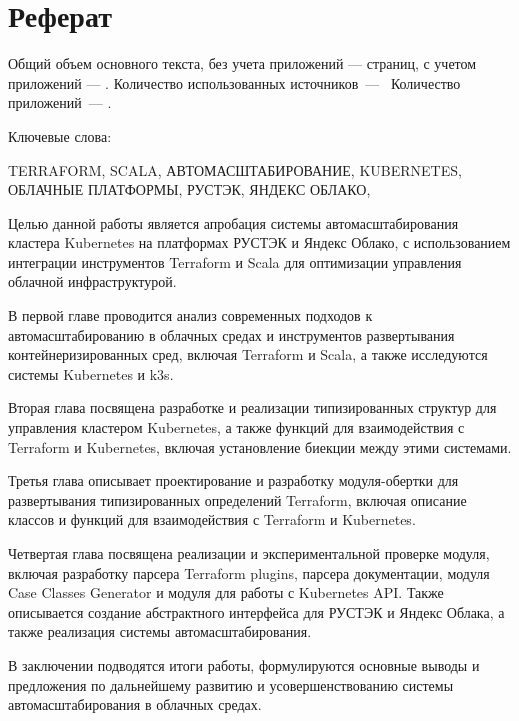 \chapter*{Реферат}
\thispagestyle{plain}

Общий объем основного текста, без учета приложений ---
\pageref{end_of_main_text} страниц, с учетом приложений ---
\pageref{end_of_document}. Количество использованных источников~--- \thetotalcitations\  
Количество приложений~--- \thetotalappendices.

Ключевые слова:

\noindent \uppercase{
terraform,
scala,
автомасштабирование,
kubernetes,
облачные платформы,
РУСТЭК,
Яндекс Облако,
}

Целью данной работы является апробация системы автомасштабирования кластера
Kubernetes на платформах РУСТЭК и Яндекс Облако, с использованием интеграции
инструментов Terraform и Scala для оптимизации управления облачной
инфраструктурой.

В первой главе проводится анализ современных подходов к автомасштабированию в
облачных средах и инструментов развертывания контейнеризированных сред, включая
Terraform и Scala, а также исследуются системы Kubernetes и k3s.

Вторая глава посвящена разработке и реализации типизированных структур для
управления кластером Kubernetes, а также функций для взаимодействия с Terraform
и Kubernetes, включая установление биекции между этими системами.

Третья глава описывает проектирование и разработку модуля-обертки для
развертывания типизированных определений Terraform, включая описание классов и
функций для взаимодействия с Terraform и Kubernetes.

Четвертая глава посвящена реализации и экспериментальной проверке модуля,
включая разработку парсера Terraform plugins, парсера документации, модуля Case
Classes Generator и модуля для работы с Kubernetes API. Также описывается
создание абстрактного интерфейса для РУСТЭК и Яндекс Облака, а также реализация
системы автомасштабирования.

В заключении подводятся итоги работы, формулируются основные выводы и
предложения по дальнейшему развитию и усовершенствованию системы
автомасштабирования в облачных средах.


